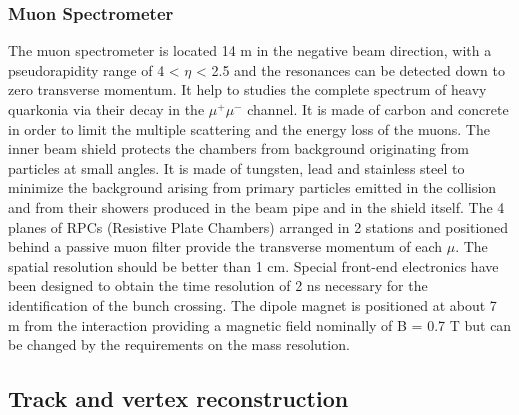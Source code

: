 \documentclass[12pt,a4paper]{book}
\begin{document}
	\subsubsection{Muon Spectrometer}
	The muon spectrometer is located 14 m in the negative beam direction, with a pseudorapidity range of 4 < $\eta$ < 2.5 and the resonances can be detected down to zero transverse momentum. It help to studies the complete spectrum of heavy quarkonia via their decay in the $\mu^+ \mu^-$ channel. It is made of carbon and concrete in order to limit the multiple scattering and the energy loss of the muons. The inner beam shield protects the chambers from background originating from particles at small angles. It is made of tungsten, lead and stainless steel to minimize the background arising from primary particles emitted in the collision and from their showers produced in the beam pipe and in the shield itself. The 4 planes of RPCs (Resistive Plate Chambers) arranged in 2 stations and positioned behind a passive muon filter provide the transverse momentum of each $\mu$. The spatial resolution should be better than 1 cm. Special front-end electronics have been designed to obtain the time resolution of 2 ns necessary for the identification of the bunch crossing. The dipole magnet is positioned at about 7 m from the interaction providing a magnetic field nominally of B = 0.7 T but can be changed by the requirements on the mass resolution.
	\cite{Padhan:2924203} \cite{Alicemuonspectometer}
	
	\subsection{Track and vertex reconstruction} 
	
\end{document}
